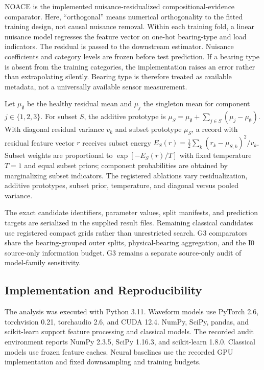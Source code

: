 \documentclass[machines,article,submit,oneauthor,pdftex]{Definitions/mdpi}
\begin{document}
NOACE is the implemented nuisance-residualized compositional-evidence comparator. Here, ``orthogonal'' means numerical orthogonality to the fitted training design, not causal nuisance removal. Within each training fold, a linear nuisance model regresses the feature vector on one-hot bearing-type and load indicators. The residual is passed to the downstream estimator. Nuisance coefficients and category levels are frozen before test prediction. If a bearing type is absent from the training categories, the implementation raises an error rather than extrapolating silently. Bearing type is therefore treated as available metadata, not a universally available sensor measurement.

Let $\mu_{\emptyset}$ be the healthy residual mean and $\mu_j$ the singleton mean for component $j\in\{1,2,3\}$. For subset $S$, the additive prototype is $\mu_S=\mu_{\emptyset}+\sum_{j\in S}(\mu_j-\mu_{\emptyset})$. With diagonal residual variance $v_k$ and subset prototype $\mu_S$, a record with residual feature vector $r$ receives subset energy $E_S(r)=\frac{1}{2}\sum_k (r_k-\mu_{S,k})^2/v_k$. Subset weights are proportional to $\exp[-E_S(r)/T]$ with fixed temperature $T=1$ and equal subset priors; component probabilities are obtained by marginalizing subset indicators. The registered ablations vary residualization, additive prototypes, subset prior, temperature, and diagonal versus pooled variance.

The exact candidate identifiers, parameter values, split manifests, and prediction targets are serialized in the supplied result files. Remaining classical candidates use registered compact grids rather than unrestricted search. G3 comparators share the bearing-grouped outer splits, physical-bearing aggregation, and the I0 source-only information budget. G3 remains a separate source-only audit of model-family sensitivity.

\subsection{Implementation and Reproducibility}

The analysis was executed with Python 3.11. Waveform models use PyTorch 2.6, torchvision 0.21, torchaudio 2.6, and CUDA 12.4. NumPy, SciPy, pandas, and scikit-learn support feature processing and classical models. The recorded audit environment reports NumPy 2.3.5, SciPy 1.16.3, and scikit-learn 1.8.0. Classical models use frozen feature caches. Neural baselines use the recorded GPU implementation and fixed downsampling and training budgets.
\end{document}
